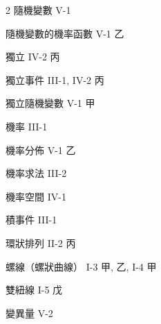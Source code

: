 \begin{multicols}{2}
\noindent 隨機變數 \dotfill V-1\par
\noindent 隨機變數的機率函數 \dotfill V-1 乙\par
\noindent 獨立 \dotfill IV-2 丙\par
\noindent 獨立事件 \dotfill III-1, IV-2 丙\par
\noindent 獨立隨機變數 \dotfill V-1 甲\par
\noindent 機率 \dotfill III-1\par
\noindent 機率分佈 \dotfill V-1 乙\par
\noindent 機率求法 \dotfill III-2\par
\noindent 機率空間 \dotfill IV-1\par
\noindent 積事件 \dotfill III-1

\noindent 環狀排列 \dotfill II-2 丙\par
\noindent 螺線（螺狀曲線） \dotfill I-3 甲, 乙, I-4 甲

\noindent 雙紐線 \dotfill I-5 戊

\noindent 變異量 \dotfill V-2

\end{multicols}
